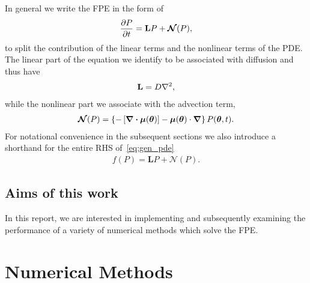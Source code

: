 \documentclass[10pt]{article}
\newcommand{\mN}{\bm{\mathcal{N}}}
\begin{document}
In general we write the FPE in the form of
\begin{align}
    \pdv{P}{t} = \mathbf{L}P + \mN(P),\label{eq:gen_pde}
\end{align}
to split the contribution of the linear terms and the nonlinear terms of the PDE. The linear part of the equation we identify to be associated with diffusion and thus have 
\begin{align}
    \mathbf{L} = D\laplacian,\label{eq:linear}
\end{align}
while the nonlinear part we associate with the advection term,
\begin{align}
    \mN(P) = \left\{-\left[\div{\bm{\mu}(\bm{\theta})}\right] - \bm{\mu}(\bm{\theta})\cdot\grad\right\}{P(\bm{\theta},t)}.\label{eq:nonlinear}
\end{align}
For notational convenience in the subsequent sections we also introduce a shorthand for the entire RHS of~\eqref{eq:gen_pde}
\begin{align}
    f(P) = \mathbf{L}P+ \mN(P).\label{eq:frhs}
\end{align}

\subsection{Aims of this work}

In this report, we are interested in implementing and subsequently examining the performance of a variety of numerical methods which solve the FPE. 


\section{Numerical Methods}
\end{document}
